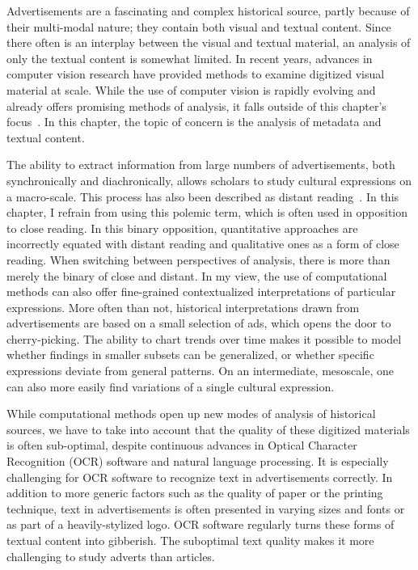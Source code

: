 \documentclass[USenglish]{article}
\begin{document}
Advertisements are a fascinating and complex historical source, partly because of their multi-modal nature; they contain both visual and textual content. Since there often is an interplay between the visual and textual material, an analysis of only the textual content is somewhat limited. In recent years, advances in computer vision research have provided methods to examine digitized visual material at scale. While the use of computer vision is rapidly evolving and already offers promising methods of analysis, it falls outside of this chapter's focus~\cite{wevers_visual_2020,arnold_distant_2019,Bergel_2015}. In this chapter, the topic of concern is the analysis of metadata and textual content.

The ability to extract information from large numbers of advertisements, both synchronically and diachronically, allows scholars to study cultural expressions on a macro-scale. This process has also been described as distant reading~\cite{moretti_distant_2013}. In this chapter, I refrain from using this polemic term, which is often used in opposition to close reading. In this binary opposition, quantitative approaches are incorrectly equated with distant reading and qualitative ones as a form of close reading. When switching between perspectives of analysis, there is more than merely the binary of close and distant. In my view, the use of computational methods can also offer fine-grained contextualized interpretations of particular expressions. More often than not, historical interpretations drawn from advertisements are based on a small selection of ads, which opens the door to cherry-picking. The ability to chart trends over time makes it possible to model whether findings in smaller subsets can be generalized, or whether specific expressions deviate from general patterns. On an intermediate, mesoscale, one can also more easily find variations of a single cultural expression. 

While computational methods open up new modes of analysis of historical sources, we have to take into account that the quality of these digitized materials is often sub-optimal, despite continuous advances in Optical Character Recognition (OCR) software and natural language processing. It is especially challenging for OCR software to recognize text in advertisements correctly. In addition to more generic factors such as the quality of paper or the printing technique, text in advertisements is often presented in varying sizes and fonts or as part of a heavily-stylized logo. OCR software regularly turns these forms of textual content into gibberish. The suboptimal text quality makes it more challenging to study adverts than articles.
\end{document}
